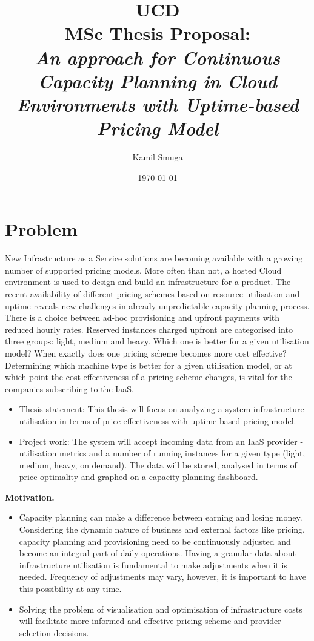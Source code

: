 \documentclass[11pt]{artikel3}
\title{UCD\\MSc Thesis Proposal:\\\emph{An approach for Continuous Capacity Planning in Cloud Environments with Uptime-based Pricing Model}}
\author{Kamil Smuga}
\date{\today}
\begin{document}
\maketitle

\section{Problem}

New Infrastructure as a Service solutions are becoming available with a growing number of supported pricing models. More often than not, a hosted Cloud environment is used to design and build an infrastructure for a product. The recent availability of different pricing schemes based on resource utilisation and uptime reveals new challenges in already unpredictable capacity planning process. There is a choice between ad-hoc provisioning and upfront payments with reduced hourly rates. Reserved instances charged upfront are categorised into three groups: light, medium and heavy. Which one is better for a given utilisation model? When exactly does one pricing scheme becomes more cost effective? Determining which machine type is better for a given utilisation model, or at which point the cost effectiveness of a pricing scheme changes, is vital for the companies subscribing to the IaaS. 

\begin{itemize}
\item Thesis statement: This thesis will focus on analyzing a system infrastructure utilisation in terms of price effectiveness with uptime-based pricing model.
\item Project work: The system will accept incoming data from an IaaS provider - utilisation metrics and a number of running instances for a given type (light, medium, heavy, on demand). The data will be stored, analysed in terms of price optimality and graphed on a capacity planning dashboard.  
\end{itemize}

{\bf Motivation.}
\begin{itemize}
\item

Capacity planning can make a difference between earning and losing money. Considering the dynamic nature of business and external factors like pricing, capacity planning and provisioning need to be continuously adjusted and become an integral part of daily operations. Having a granular data about infrastructure utilisation is fundamental to make adjustments when it is needed. Frequency of adjustments may vary, however, it is important to have this possibility at any time.
\item Solving the problem of visualisation and optimisation of infrastructure costs will facilitate more informed and effective pricing scheme and provider selection decisions.

\end{itemize}
\end{document}
